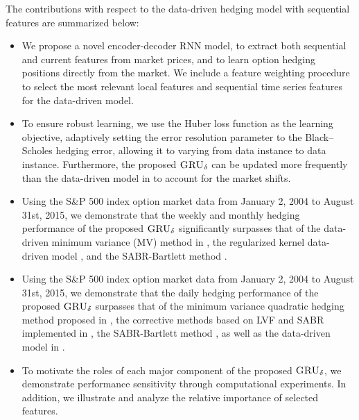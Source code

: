 \documentclass[letterpaper,12pt,titlepage,oneside,final]{book}
\numberwithin{equation}{section}
\theoremstyle{definition}
\newcommand{\model}{\textsc{GRU}_\delta}
\begin{document}
The contributions with respect to the data-driven  hedging model with sequential features \cite{knian2019} are summarized below:
\begin{itemize}
	\item  We propose a novel encoder-decoder  RNN model, to extract both sequential and current features from market prices, and  to learn option hedging positions directly from the market. We include a feature weighting procedure to select the most relevant local features and sequential time series features for the data-driven model.
	\item To ensure robust learning, we use the Huber loss function as the learning objective,  adaptively setting the error resolution parameter to the Black–Scholes hedging error, allowing it to varying from data instance to data instance. Furthermore,    the proposed $\model$ can be updated more frequently than the data-driven model in \cite{knian2017} to account for the market shifts.
	\item Using the S\&P 500 index option market data from January 2, 2004 to  August 31st, 2015, we demonstrate that the weekly and monthly hedging performance of the proposed $\model$ significantly surpasses that
 of the data-driven minimum variance (MV) method in \citep{hulloptimal}, the regularized kernel data-driven model \citep{knian2017}, and the SABR-Bartlett method \cite{bartlett2006hedging}.
	\item Using the S\&P 500 index option market data from January 2, 2004 to  August 31st, 2015, we demonstrate that
	the daily hedging performance of the proposed $\model$ surpasses that of the minimum variance quadratic hedging method  proposed in \cite{hulloptimal}, the corrective methods
	based on LVF and SABR implemented in \cite{hulloptimal}, the SABR-Bartlett method \cite{bartlett2006hedging}, as well as the data-driven model in \cite{knian2017}.
	\item To motivate the roles of each major component of the proposed $\model$, we demonstrate performance sensitivity through computational experiments. In addition, we illustrate and analyze the relative importance of selected features.
\end{itemize}
\end{document}
